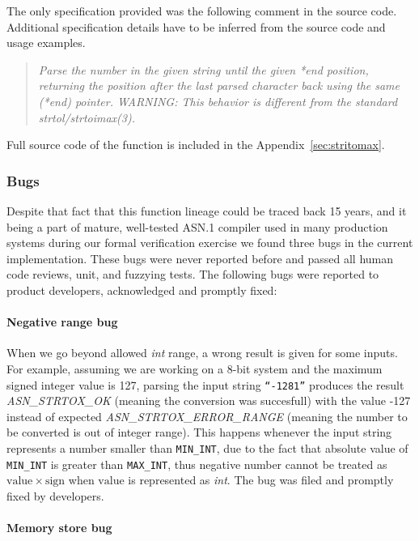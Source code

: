 \documentclass[acmsmall,nonacm]{acmart}
\begin{document}
The only specification provided was the following comment in the
source code. Additional specification details have to be inferred from
the source code and usage examples.

\begin{quote}
 { \it Parse the number in the given string until the given *end position,
 returning the position after the last parsed character back using the
 same (*end) pointer.
 WARNING: This behavior is different from the standard strtol/strtoimax(3). }
\end{quote}

Full source code of the function is included in the Appendix~\ref{sec:stritomax}.

\subsubsection{Bugs}

Despite that fact that this function lineage could be traced back 15
years, and it being a part of mature, well-tested ASN.1 compiler used in
many production systems during our formal verification exercise we
found three bugs in the current implementation. These bugs were never
reported before and passed all human code reviews, unit, and fuzzying
tests. The following bugs were reported to product developers,
acknowledged and promptly fixed:
  
\paragraph{Negative range bug}

When we go beyond allowed \textit{int} range, a wrong result is given
for some inputs. For example, assuming we are working on a 8-bit
system and the maximum signed integer value is 127, parsing the input
string \texttt{``-1281''} produces the result
\emph{ASN\_STRTOX\_OK} (meaning the conversion was succesfull) with the value -127 instead of expected
\emph{ASN\_STRTOX\_ERROR\_RANGE} (meaning the number to be converted is out of integer range). This happens whenever the input
string represents a number smaller than \texttt{MIN\_INT}, due to the
fact that absolute value of \texttt{MIN\_INT} is greater than
\texttt{MAX\_INT}, thus negative number cannot be treated as
$\mathrm{value}\times\mathrm{sign}$ when $\mathrm{value}$ is
represented as \textit{int}. The bug was filed and promptly fixed by
developers.

\paragraph{Memory store bug}
\end{document}
